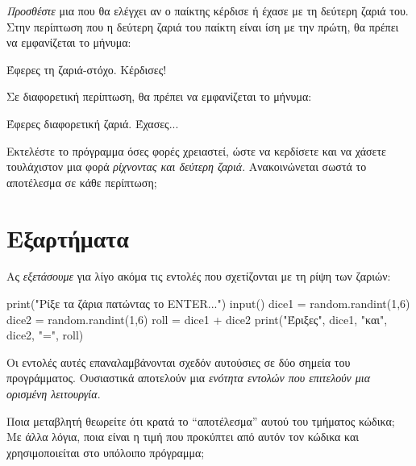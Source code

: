 \documentclass[a4paper,11pt,oneside]{book}
\begin{document}
\begin{step}
\emph{Προσθέστε} μια  που θα ελέγχει αν ο παίκτης κέρδισε ή έχασε με τη δεύτερη ζαριά του.
Στην περίπτωση που η δεύτερη ζαριά του παίκτη είναι ίση με την πρώτη, θα πρέπει να εμφανίζεται το μήνυμα:

\marginnote[16pt]{\iconcomputer}
\begin{pyterm}
Έφερες τη ζαριά-στόχο. Κέρδισες!
\end{pyterm}

Σε διαφορετική περίπτωση, θα πρέπει να εμφανίζεται το μήνυμα:

\marginnote[16pt]{\iconcomputer}
\begin{pyterm}
Έφερες διαφορετική ζαριά. Έχασες...
\end{pyterm}

Εκτελέστε το πρόγραμμα όσες φορές χρειαστεί, ώστε να κερδίσετε και να χάσετε τουλάχιστον μια φορά \emph{ρίχνοντας και δεύτερη ζαριά}. Ανακοινώνεται σωστά το αποτέλεσμα σε κάθε περίπτωση;

\marginnote[14pt]{\icondiscuss}
\dottedline
\end{step}

\section{Εξαρτήματα}

\begin{step}
\label{step:roll-commands}
Ας \emph{εξετάσουμε} για λίγο ακόμα τις εντολές που σχετίζονται με τη ρίψη των ζαριών:

\begin{pyplain}
print("Ρίξε τα ζάρια πατώντας το ENTER...")
input()
dice1 = random.randint(1,6)
dice2 = random.randint(1,6)
roll = dice1 + dice2
print("Έριξες", dice1, "και", dice2, "=", roll)
\end{pyplain}

Οι εντολές αυτές επαναλαμβάνονται σχεδόν αυτούσιες σε δύο σημεία του προγράμματος. Ουσιαστικά αποτελούν μια \emph{ενότητα εντολών που επιτελούν μια ορισμένη λειτουργία}. 






Ποια μεταβλητή θεωρείτε ότι κρατά το ``αποτέλεσμα'' αυτού του τμήματος κώδικα; Με άλλα λόγια, ποια είναι η τιμή που προκύπτει από αυτόν τον κώδικα και χρησιμοποιείται στο υπόλοιπο πρόγραμμα;

\marginnote[14pt]{\icondiscuss}
\dottedline
\end{step}
\end{document}
